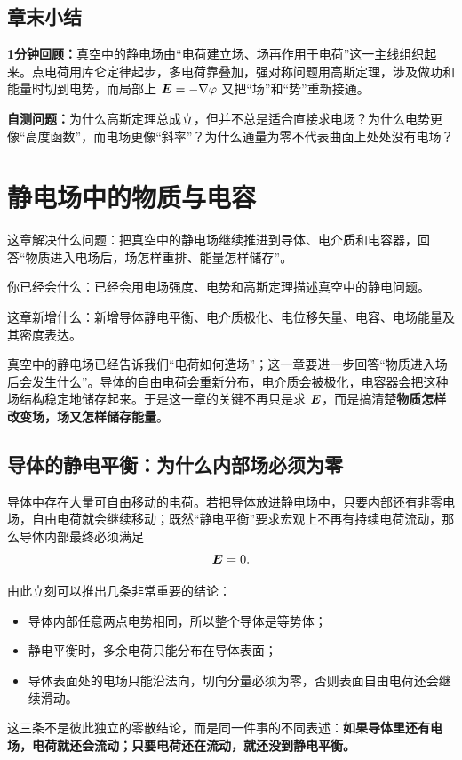 \documentclass[lang=cn,11pt]{elegantbook}
\newcommand{\bridge}[1]{\begin{note}#1\end{note}}
\newcommand{\chapterroadmap}[3]{%
\begin{introduction}
  \item {\heiti 这章解决什么问题：}#1
  \item {\heiti 你已经会什么：}#2
  \item {\heiti 这章新增什么：}#3
\end{introduction}}
\newcommand{\summaryline}[1]{\par\noindent\textbf{1分钟回顾：}#1\par}
\newcommand{\chapterselfcheck}[1]{\par\noindent\textbf{自测问题：}#1\par}
\begin{document}
\section{章末小结}

\summaryline{真空中的静电场由“电荷建立场、场再作用于电荷”这一主线组织起来。点电荷用库仑定律起步，多电荷靠叠加，强对称问题用高斯定理，涉及做功和能量时切到电势，而局部上 \(\vb*{E}=-\nabla\varphi\) 又把“场”和“势”重新接通。}
\chapterselfcheck{为什么高斯定理总成立，但并不总是适合直接求电场？为什么电势更像“高度函数”，而电场更像“斜率”？为什么通量为零不代表曲面上处处没有电场？}

\chapter{静电场中的物质与电容}

\chapterroadmap
{把真空中的静电场继续推进到导体、电介质和电容器，回答“物质进入电场后，场怎样重排、能量怎样储存”。}
{已经会用电场强度、电势和高斯定理描述真空中的静电问题。}
{新增导体静电平衡、电介质极化、电位移矢量、电容、电场能量及其密度表达。}

\bridge{真空中的静电场已经告诉我们“电荷如何造场”；这一章要进一步回答“物质进入场后会发生什么”。导体的自由电荷会重新分布，电介质会被极化，电容器会把这种场结构稳定地储存起来。于是这一章的关键不再只是求 \(\vb*{E}\)，而是搞清楚\textbf{物质怎样改变场，场又怎样储存能量}。}

\section{导体的静电平衡：为什么内部场必须为零}

导体中存在大量可自由移动的电荷。若把导体放进静电场中，只要内部还有非零电场，自由电荷就会继续移动；既然“静电平衡”要求宏观上不再有持续电荷流动，那么导体内部最终必须满足
\[
\vb*{E}=0.
\]

由此立刻可以推出几条非常重要的结论：
\begin{itemize}
  \item 导体内部任意两点电势相同，所以整个导体是等势体；
  \item 静电平衡时，多余电荷只能分布在导体表面；
  \item 导体表面处的电场只能沿法向，切向分量必须为零，否则表面自由电荷还会继续滑动。
\end{itemize}

\begin{remark}
这三条不是彼此独立的零散结论，而是同一件事的不同表述：\textbf{如果导体里还有电场，电荷就还会流动；只要电荷还在流动，就还没到静电平衡。}
\end{remark}
\end{document}

